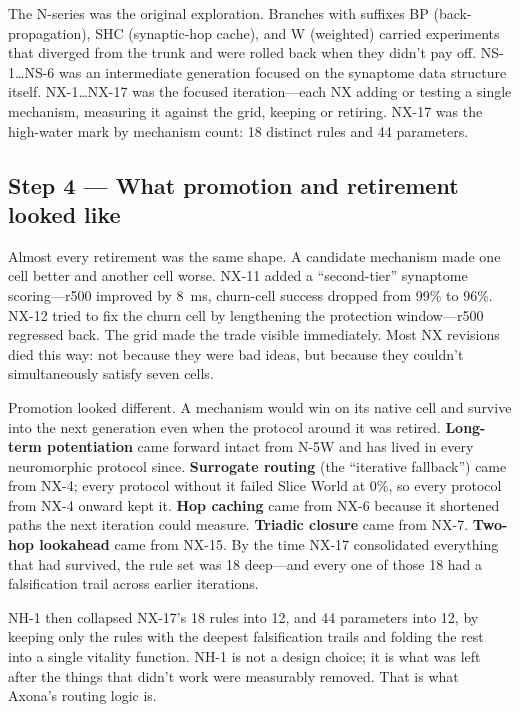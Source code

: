 \documentclass[nobib]{tufte-handout}
\begin{document}
The N-series was the original exploration. Branches with suffixes BP (back-propagation), SHC (synaptic-hop cache), and W (weighted) carried experiments that diverged from the trunk and were rolled back when they didn't pay off. NS-1\dots NS-6 was an intermediate generation focused on the synaptome data structure itself. NX-1\dots NX-17 was the focused iteration---each NX adding or testing a single mechanism, measuring it against the grid, keeping or retiring. NX-17 was the high-water mark by mechanism count: 18 distinct rules and 44 parameters.

\subsection*{Step 4 --- What promotion and retirement looked like}

Almost every retirement was the same shape. A candidate mechanism made one cell better and another cell worse. NX-11 added a ``second-tier'' synaptome scoring---r500 improved by 8~ms, churn-cell success dropped from 99\% to 96\%. NX-12 tried to fix the churn cell by lengthening the protection window---r500 regressed back. The grid made the trade visible immediately. Most NX revisions died this way: not because they were bad ideas, but because they couldn't simultaneously satisfy seven cells.

Promotion looked different. A mechanism would win on its native cell and survive into the next generation even when the protocol around it was retired. \textbf{Long-term potentiation} came forward intact from N-5W and has lived in every neuromorphic protocol since. \textbf{Surrogate routing} (the ``iterative fallback'') came from NX-4; every protocol without it failed Slice World at 0\%, so every protocol from NX-4 onward kept it. \textbf{Hop caching} came from NX-6 because it shortened paths the next iteration could measure. \textbf{Triadic closure} came from NX-7. \textbf{Two-hop lookahead} came from NX-15. By the time NX-17 consolidated everything that had survived, the rule set was 18 deep---and every one of those 18 had a falsification trail across earlier iterations.

NH-1 then collapsed NX-17's 18 rules into 12, and 44 parameters into 12, by keeping only the rules with the deepest falsification trails and folding the rest into a single vitality function. NH-1 is not a design choice; it is what was left after the things that didn't work were measurably removed. That is what Axona's routing logic is.
\end{document}
